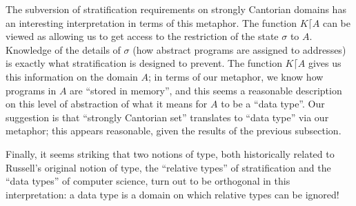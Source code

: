 The subversion of stratification
requirements on strongly Cantorian 
domains has an interesting interpretation in terms of this metaphor.
The function $K \lceil A$ can be viewed as allowing us to get access
to the restriction of the state $\sigma$ to $A$.  Knowledge of the
details of $\sigma$ (how abstract programs are assigned to addresses)
is exactly what stratification is designed to prevent.
The function 
$K \lceil A$ gives us this information on the domain $A$; in terms of
our metaphor, we know how programs in $A$ are ``stored in memory'',
and this seems a reasonable description on this level of abstraction
of what it means for $A$ to be a ``data type''.  Our suggestion is 
that ``strongly Cantorian set'' translates to ``data type'' via our
metaphor; this appears reasonable, given the results of the previous
subsection.

Finally, it seems striking that two notions of type, both historically
related to Russell's original notion of type, the ``relative types'' 
of stratification and the ``data types'' of computer
science, turn out 
to be orthogonal in this interpretation: a data type is a domain on
which relative types can be ignored!
